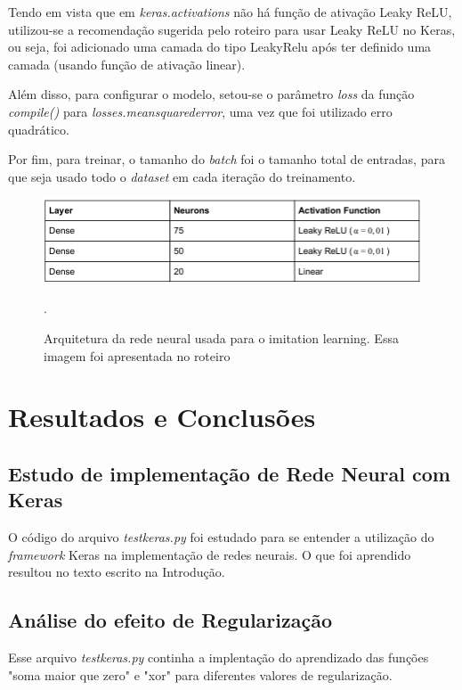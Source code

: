 \documentclass[conference]{IEEEtran}
\begin{document}
Tendo em vista que em \textit{keras.activations} não há função de ativação Leaky ReLU, utilizou-se a recomendação sugerida pelo roteiro \cite{roteiro} para usar Leaky ReLU no Keras, ou seja, foi adicionado uma camada do tipo LeakyRelu após ter definido uma camada (usando função de ativação linear).

Além disso, para configurar o modelo, setou-se o parâmetro \textit{loss} da função \textit{compile()} para \textit{losses.mean\underline{\space}squared\underline{\space}error}, uma vez que foi utilizado erro quadrático.

Por fim, para treinar, o tamanho do \textit{batch} foi o tamanho total de entradas, para que seja usado todo o \textit{dataset} em cada iteração do treinamento.

\begin{figure}[htbp]
\centering
\centerline{\includegraphics[scale=0.3]{imagens/arquitetura_rede_neural.png}}
\caption{Arquitetura da rede neural usada para o imitation learning. Essa imagem foi apresentada no roteiro \cite{roteiro}}.
\label{arquitetura_rede_neural}
\end{figure}

\section{Resultados e Conclusões}

\subsection{Estudo de implementação de Rede Neural com Keras}
O código do arquivo \textit{test\underline{\space}keras.py} foi estudado para se entender a utilização do \textit{framework} Keras na implementação de redes neurais. O que foi aprendido resultou no texto escrito na Introdução.

\subsection{Análise do efeito de Regularização}
Esse arquivo \textit{test\underline{\space}keras.py} continha a implentação do aprendizado das funções "soma maior que zero" e "xor" para diferentes valores de regularização.
\end{document}
